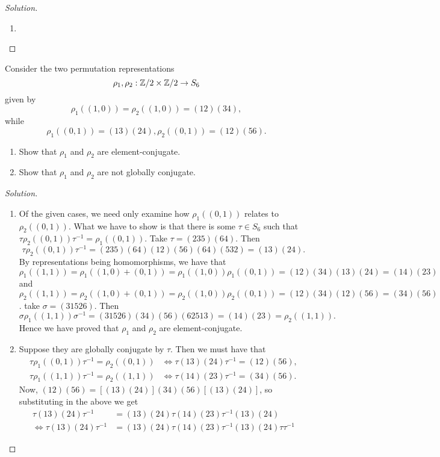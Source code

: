 \begin{proof}[Solution]
\hfill
\begin{enumerate}[font=\normalfont,label=\textbf{(\alph*)}, wide]
\item
\end{enumerate}
\end{proof}

\newpage


\begin{problem}
Consider the two permutation representations 
\[
\rho_1, \rho_2 : \mathbb{Z}/2 \times \mathbb{Z}/2 \to S_6
\]
given by 
\[
\rho_1 ((1, 0)) = \rho_2((1, 0)) = (12)(34), 
\]
while
\[
\rho_1 ((0, 1)) = (13)(24), \rho_2((0, 1)) = (12)(56).
\]
\begin{enumerate}[font=\normalfont,label=\textbf{(\alph*)}]
\item Show that $\rho_1$ and $\rho_2$ are element-conjugate. 
\item Show that $\rho_1$ and $\rho_2$ are not globally conjugate.

\end{enumerate}
\end{problem}

\begin{proof}[Solution]
\hfill
\begin{enumerate}[font=\normalfont,label=\textbf{(\alph*)}, wide]
\item Of the given cases, we need only examine how $\rho_1 ((0, 1))$ relates to $\rho_2((0, 1))$. What we have to show is that there is some $\tau \in S_6$ such that $\tau \rho_2((0, 1)) \tau^{-1} = \rho_1((0, 1))$. Take $\tau = (235)(64)$. Then
\[
\tau \rho_2((0, 1)) \tau^{-1} = (235)(64)(12)(56)(64)(532) = (13)(24). 
\]
By representations being homomorphisms, we have that $\rho_1((1, 1)) = \rho_1((1, 0) + (0,1)) =  \rho_1((1, 0)) \rho_1((0, 1)) = (12)(34)(13)(24) = (14)(23)$ and $\rho_2((1, 1)) = \rho_2((1, 0) + (0,1)) =  \rho_2((1, 0)) \rho_2((0, 1)) = (12)(34)(12)(56) = (34)(56)$. take $\sigma = (31526)$. Then
\[
\sigma\rho_1((1, 1))\sigma^{-1} = (31526)(34)(56)(62513) = (14)(23) = \rho_2((1,1)).
\]
Hence we have proved that $\rho_1$ and $\rho_2$ are element-conjugate. 

\item Suppose they are globally conjugate by $\tau$. Then we must have that
\[
\begin{aligned}
\tau \rho_1((0, 1))\tau^{-1} = \rho_2((0, 1)) &\iff \tau (13)(24)\tau^{-1} = (12)(56), \\
\tau \rho_1((1, 1))\tau^{-1} = \rho_2((1, 1)) &\iff \tau (14)(23)\tau^{-1} = (34)(56). 
\end{aligned}
\]
Now, $(12)(56) = [(13)(24)](34)(56)[(13)(24)]$, so substituting in the above we get
\[
\begin{aligned}
\tau (13)(24)\tau^{-1} &= (13)(24)\tau (14)(23)\tau^{-1} (13)(24) \\
\iff \tau (13)(24)\tau^{-1} &= (13)(24)\tau (14)(23)\tau^{-1} (13)(24)\tau\tau^{-1}
\end{aligned}
\]
\end{enumerate}
\end{proof}
